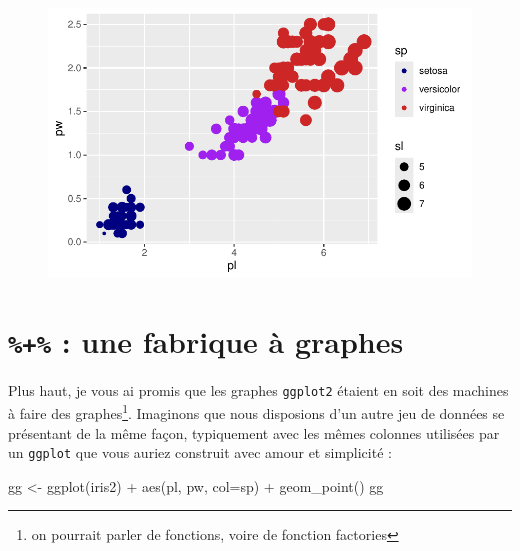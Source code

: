 \documentclass[
  letterpaper,
  DIV=11,
  numbers=noendperiod]{scrreprt}
\newenvironment{Shaded}{\begin{snugshade}}{\end{snugshade}}
\newcommand{\AttributeTok}[1]{\textcolor[rgb]{0.40,0.45,0.13}{#1}}
\newcommand{\FunctionTok}[1]{\textcolor[rgb]{0.28,0.35,0.67}{#1}}
\newcommand{\NormalTok}[1]{\textcolor[rgb]{0.00,0.23,0.31}{#1}}
\newcommand{\OtherTok}[1]{\textcolor[rgb]{0.00,0.23,0.31}{#1}}
\newcommand{\SpecialCharTok}[1]{\textcolor[rgb]{0.37,0.37,0.37}{#1}}
\begin{document}
\begin{figure}[H]

{\centering \includegraphics{ggplot2_files/figure-pdf/unnamed-chunk-30-1.pdf}

}

\end{figure}

\hypertarget{une-fabrique-uxe0-graphes}{%
\section{\texorpdfstring{\texttt{\%+\%} : une fabrique à
graphes}{\%+\% : une fabrique à graphes}}\label{une-fabrique-uxe0-graphes}}

Plus haut, je vous ai promis que les graphes \texttt{ggplot2} étaient en
soit des machines à faire des graphes\footnote{on pourrait parler de
  fonctions, voire de fonction factories}. Imaginons que nous disposions
d'un autre jeu de données se présentant de la même façon, typiquement
avec les mêmes colonnes utilisées par un \texttt{ggplot} que vous auriez
construit avec amour et simplicité :

\begin{Shaded}
\begin{Highlighting}[]
\NormalTok{gg }\OtherTok{\textless{}{-}} \FunctionTok{ggplot}\NormalTok{(iris2) }\SpecialCharTok{+} \FunctionTok{aes}\NormalTok{(pl, pw, }\AttributeTok{col=}\NormalTok{sp) }\SpecialCharTok{+} \FunctionTok{geom\_point}\NormalTok{()}
\NormalTok{gg}
\end{Highlighting}
\end{Shaded}
\end{document}

